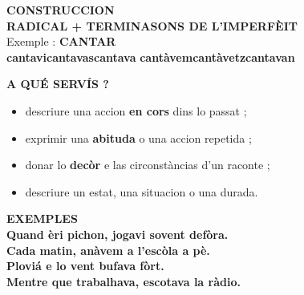 \documentclass[a4paper,11pt]{article}
\begin{document}
\vspace{2.5mm}\hspace*{6mm}
\begin{minipage}{0.91\textwidth}

\begin{bluebox}
\textbf{\color{BlueDark}CONSTRUCCION}\\[1mm]
\centering
{\Large \textbf{RADICAL + TERMINASONS DE L'IMPERFÈIT}}\\[1mm]
\small
Exemple : \textbf{CANTAR}\\[1mm]
\textbf{cantavi}\quad \textbf{cantavas}\quad \textbf{cantava}\quad
\textbf{cantàvem}\quad \textbf{cantàvetz}\quad \textbf{cantavan}
\end{bluebox}

\vspace{2.5mm}
\begin{center}
\end{center}

\vspace{1.5mm}
\begin{bluebox}
\textbf{\color{BlueDark}A QUÉ SERVÍS ?}\\[1mm]
\begin{itemize}\setlength{\itemsep}{0.4mm}
\item descriure una accion \textbf{en cors} dins lo passat ;
\item exprimir una \textbf{abituda} o una accion repetida ;
\item donar lo \textbf{decòr} e las circonstàncias d'un raconte ;
\item descriure un estat, una situacion o una durada.
\end{itemize}
\end{bluebox}

\vspace{2mm}
\begin{bluebox}
\textbf{\color{BlueDark}EXEMPLES}\\[1mm]
\textbf{Quand èri pichon, jogavi sovent defòra.}\\
\textbf{Cada matin, anàvem a l'escòla a pè.}\\
\textbf{Ploviá e lo vent bufava fòrt.}\\
\textbf{Mentre que trabalhava, escotava la ràdio.}
\end{bluebox}


\end{minipage}
\end{document}
